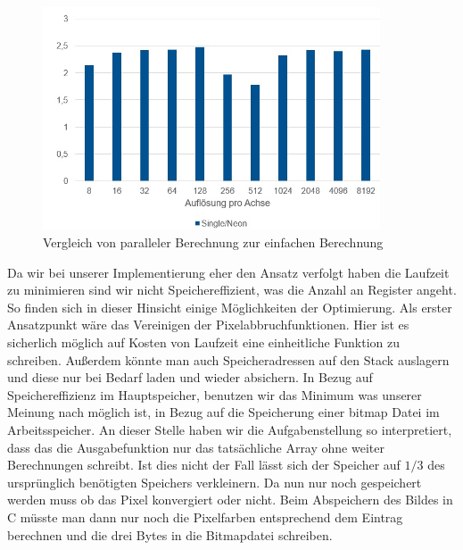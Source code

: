 \documentclass[11pt]{scrartcl}
\begin{document}
\begin{figure}[!ht]
  \begin{center}
    \includegraphics[width=10cm]{pictures/Geschwindigkeitsvergleich}
  \end{center}
  \caption{Vergleich von paralleler Berechnung zur einfachen Berechnung}
  \label{fig:v-Vergleich}
\end{figure}


Da wir bei unserer Implementierung eher den Ansatz verfolgt haben die Laufzeit zu minimieren sind wir nicht Speichereffizient, was die Anzahl an Register angeht.
So finden sich in dieser Hinsicht einige Möglichkeiten der Optimierung.
Als erster Ansatzpunkt wäre das Vereinigen der Pixelabbruchfunktionen.
Hier ist es sicherlich möglich auf Kosten von Laufzeit eine einheitliche Funktion zu schreiben.
Außerdem könnte man auch Speicheradressen auf den Stack auslagern und diese nur bei Bedarf laden und wieder absichern.
In Bezug auf Speichereffizienz im Hauptspeicher, benutzen wir das Minimum was unserer Meinung nach möglich ist, in Bezug auf die Speicherung einer bitmap Datei im Arbeitsspeicher.
An dieser Stelle haben wir die Aufgabenstellung so interpretiert, dass das die Ausgabefunktion nur das tatsächliche Array ohne weiter Berechnungen schreibt.
Ist dies nicht der Fall lässt sich der Speicher auf $1/3$ des ursprünglich benötigten Speichers verkleinern.
Da nun nur noch gespeichert werden muss ob das Pixel konvergiert oder nicht.
Beim Abspeichern des Bildes in C müsste man dann nur noch die Pixelfarben entsprechend dem Eintrag berechnen und die drei Bytes in die Bitmapdatei schreiben.
\end{document}
